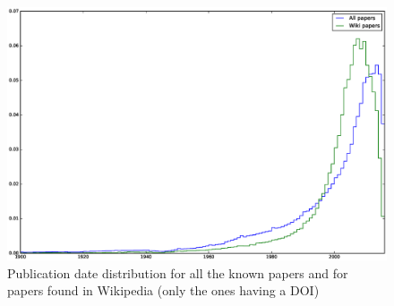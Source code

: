 \begin{figure}[h]
\centering
\includegraphics[keepaspectratio=true, width=\textwidth]{assets/publication_date_pdf}
\caption{Publication date distribution for all the known papers and for papers found in Wikipedia (only the ones having a DOI)}
\label{fig:publication_date_pdf}
\end{figure}

